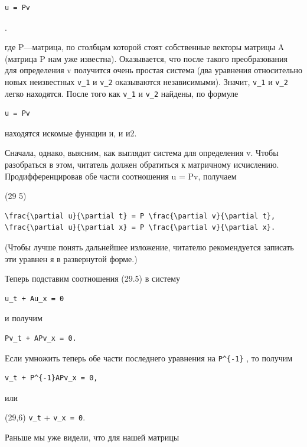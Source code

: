 \documentclass[
  ukrainian,
]{article}
\begin{document}
\begin{verbatim}
u = Pv
\end{verbatim}

.

где P---матрица, по столбцам которой стоят собственные векторы матрицы A
(матрица P нам уже известна). Оказывается, что после такого
преобразования для определения v получится очень простая система (два
уравнения относительно новых неизвестных \texttt{v\_1} и \texttt{v\_2}
оказываются независимыми). Значит, \texttt{v\_1} и \texttt{v\_2} легко
находятся. После того как \texttt{v\_1} и \texttt{v\_2} найдены, по
формуле

\begin{verbatim}
u = Pv
\end{verbatim}

находятся искомые функции и, и и2.

Сначала, однако, выясним, как выглядит система для определения v. Чтобы
разобраться в этом, читатель должен обратиться к матричному исчислению.
Продифференцировав обе части соотношения u = Pv, получаем

(29 5)

\begin{verbatim}
\frac{\partial u}{\partial t} = P \frac{\partial v}{\partial t},
\frac{\partial u}{\partial x} = P \frac{\partial v}{\partial x}.
\end{verbatim}

(Чтобы лучше понять дальнейшее изложение, читателю рекомендуется
записать эти уравнен я в развернутой форме.)

Теперь подставим соотношения (29.5) в систему

\begin{verbatim}
u_t + Au_x = 0
\end{verbatim}

и получим

\begin{verbatim}
Pv_t + APv_x = 0.
\end{verbatim}

Если умножить теперь обе части последнего уравнения на
\texttt{P\^{}\{-1\}} , то получим

\begin{verbatim}
v_t + P^{-1}APv_x = 0,
\end{verbatim}

или

(29,6) \texttt{v\_t} +  \texttt{v\_x\ =\ 0}.

Раньше мы уже видели, что для нашей матрицы
\end{document}
